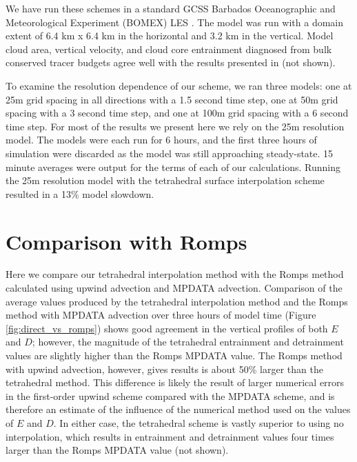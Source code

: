 \documentclass[12pt]{article}
\begin{document}
We have run these schemes in a standard GCSS Barbados Oceanographic and 
Meteorological Experiment (BOMEX) LES \citep{Holland1973, Siebesma2003}.  The 
model was run with a domain extent of 6.4 km x 6.4 km in the horizontal and 
3.2 km in the vertical.  Model cloud area, vertical velocity, and cloud core 
entrainment diagnosed from bulk conserved tracer budgets agree well with the 
results presented in \cite{Siebesma2003} (not shown).

To examine the resolution dependence of our scheme, we ran three models: one at 
25m grid spacing in all directions with a 1.5 second time step, one at 50m grid 
spacing with a 3 second time step, and one at 100m grid spacing with a 6 second 
time step.  For most of the results we present here we rely on the 25m 
resolution model.  The models were each run for 6 hours, and the first 
three hours of simulation were discarded as the model was still approaching
steady-state.  15 minute averages were output for the terms of each of our 
calculations.  Running the 25m resolution model with the tetrahedral surface 
interpolation scheme resulted in a 13\% model slowdown.  


\section{Comparison with Romps}

Here we compare our tetrahedral interpolation method with the Romps method 
calculated using upwind advection and MPDATA advection.  Comparison of the 
average values produced by the tetrahedral interpolation method and the Romps 
method with MPDATA advection over three hours of model time (Figure 
\ref{fig:direct_vs_romps}) shows good agreement in the vertical profiles of 
both $E$ and $D$; however, the magnitude of the tetrahedral entrainment and 
detrainment values are slightly higher than the Romps MPDATA value.  The Romps 
method with upwind advection, however, gives results is about 50\% larger than 
the tetrahedral method.  This difference is likely the result of larger 
numerical errors in the first-order upwind scheme compared with the MPDATA 
scheme, and is therefore an estimate of the influence of the numerical method 
used on the values of $E$ and $D$.  In either case, the tetrahedral scheme is 
vastly superior to using no interpolation, which results in entrainment and 
detrainment values four times larger than the Romps MPDATA value (not shown).  
\end{document}
